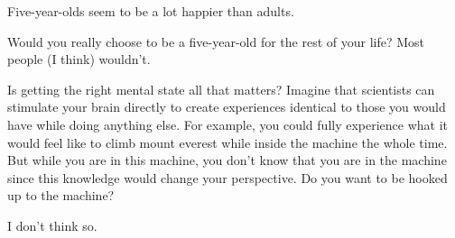 \begin{problem}
Five-year-olds seem to be a lot happier than adults. 

\begin{solution}[Response]
Would you really choose to be a five-year-old for the rest of your life? Most people (I think) wouldn't.
\end{solution}
\end{problem}

\begin{problem}
Is getting the right mental state all that matters? Imagine that scientists can stimulate your brain directly to create experiences identical to those you would have while doing anything else. For example, you could fully experience what it would feel like to climb mount everest while inside the machine the whole time. But while you are in this machine, you don't know that you are in the machine since this knowledge would change your perspective. Do you want to be hooked up to the machine?

\begin{solution}
I don't think so.
\end{solution}
\end{problem}
